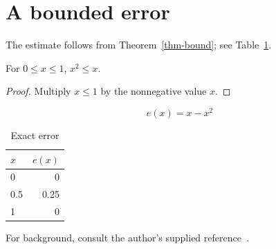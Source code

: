 \section{A bounded error}
The estimate follows from Theorem~\ref{thm-bound}; see Table~\ref{tab-error}.
\begin{theorem}\label{thm-bound}
For $0\le x\le1$, $x^2\le x$.
\end{theorem}
\begin{proof}Multiply $x\le1$ by the nonnegative value $x$.\end{proof}
\begin{equation}\label{eq-error}e(x)=x-x^2\end{equation}
\begin{table}\caption{Exact error}\label{tab-error}
\begin{tabular}{lr}\toprule $x$ & $e(x)$ \\ \midrule
0 & 0 \\ 0.5 & 0.25 \\ 1 & 0 \\ \bottomrule\end{tabular}
\end{table}
For background, consult the author's supplied reference~\cite{course-notes}.
